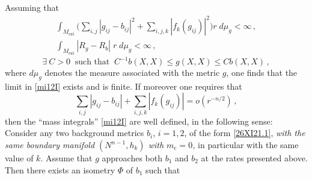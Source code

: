 \documentclass[a4paper,10pt]{article}
\newcommand{\Nk}{\red{N^{n-1}}}
\newcommand{\hk}{\red{h_{k}}}
\newcommand{\HMext}{\red{ {M_\ext}}}
\newcommand{\red}[1]{{\color{red}#1}}
\newcommand{\mc}{\red{m_{\mathrm c}}}
\newcommand{\be}{\begin{equation}}
\newcommand{\ee}{\end{equation}}
\newcommand{\ext}{\mathrm{ext}}
\renewcommand{\red}[1]{#1}%
\begin{document}
     Assuming that
     \begin{subequations}
      \label{Hm3}
     \begin{gather}\label{Hm3a}
      \displaystyle
      \int_{\HMext} \big( \sum_{i,j} |g_{ij}-b_{ij}|^2 + \sum_{i,
      j,k} |f_k(g_{ij})|^2 \big)r
      \;d\mu_g<\infty\,,
     \\
      \displaystyle
      \int_{\HMext} |R_g-R_b|\;r\;d\mu_g<\infty\,,\label{Hm3b}
    \end{gather}
  \end{subequations}
     \begin{equation}
     \label{m0} \exists \ C > 0 \ \textrm{ such that }\
     C^{-1}b(X,X)\le g(X,X)\le Cb(X,X)\,,
     \end{equation}
     where
     $d \mu_{g}$ denotes the measure associated with
     the metric $g$,
     one finds that the limit in \eqref{mi12I} exists and is finite. If moreover
     one requires that
      \be
       \label{m5}
      \sum_{i,j}
         |g_{ij}-b_{ij}| + \sum_{i, j,k} |f_k(g_{ij})|=
         o(r^{-n/2})\,,
     \ee
     then the ``mass integrals'' \eqref{mi12I} are well defined, in the following sense: Consider
     any two background metrics $b_i$, $i=1,2$, of the form \eqref{26XI21.1},
     \emph{with the same boundary manifold $(\Nk,\hk)$ with $\mc=0$,} in particular with the same value of $k$. Assume
      that $g$ approaches both $b_1$ and $b_2$ at the rates presented above. Then
      there exists an isometry $\Phi$ of $b_1$  such that
\end{document}
